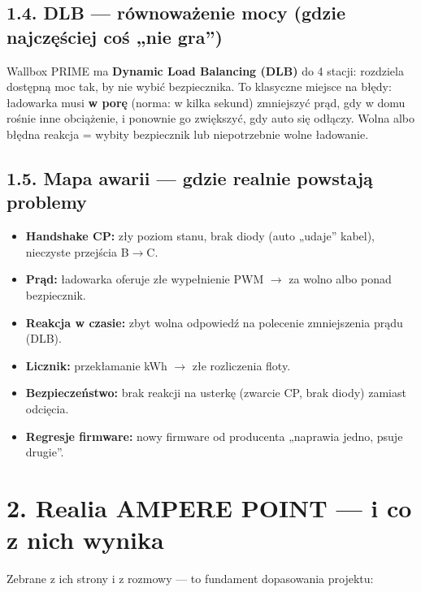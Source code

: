\documentclass[11pt]{article}
\newcommand{\ra}{$\rightarrow$}
\newcommand{\key}[1]{\textbf{\color{navy}#1}}
\begin{document}
\subsection{1.4. DLB --- równoważenie mocy (gdzie najczęściej coś „nie gra'')}

Wallbox PRIME ma \key{Dynamic Load Balancing (DLB)} do 4 stacji: rozdziela dostępną moc tak, by nie wybić bezpiecznika. To klasyczne miejsce na błędy: ładowarka musi \key{w porę} (norma: w kilka sekund) zmniejszyć prąd, gdy w domu rośnie inne obciążenie, i ponownie go zwiększyć, gdy auto się odłączy. Wolna albo błędna reakcja = wybity bezpiecznik lub niepotrzebnie wolne ładowanie.

\subsection{1.5. Mapa awarii --- gdzie realnie powstają problemy}

\begin{itemize}
  \item \key{Handshake CP:} zły poziom stanu, brak diody (auto „udaje'' kabel), nieczyste przejścia B\ra{}C.
  \item \key{Prąd:} ładowarka oferuje złe wypełnienie PWM \ra{} za wolno albo ponad bezpiecznik.
  \item \key{Reakcja w czasie:} zbyt wolna odpowiedź na polecenie zmniejszenia prądu (DLB).
  \item \key{Licznik:} przekłamanie kWh \ra{} złe rozliczenia floty.
  \item \key{Bezpieczeństwo:} brak reakcji na usterkę (zwarcie CP, brak diody) zamiast odcięcia.
  \item \key{Regresje firmware:} nowy firmware od producenta „naprawia jedno, psuje drugie''.
\end{itemize}

\section{2. Realia AMPERE POINT --- i co z nich wynika}

Zebrane z ich strony i z rozmowy --- to fundament dopasowania projektu:
\end{document}
